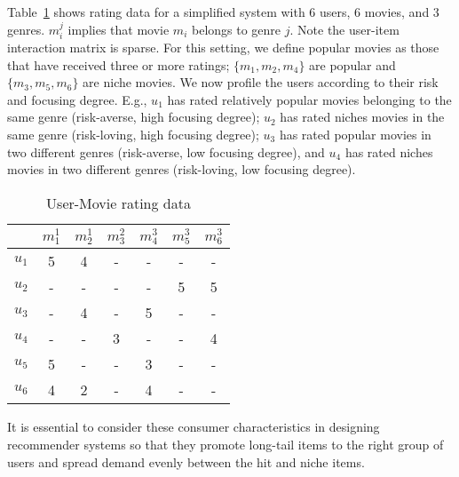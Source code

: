 \begin{example}  
Table~\ref{tab:example} shows rating data for a simplified system with $6$ users, $6$ movies, and $3$ genres. $m_i^{j}$ implies that movie $m_i$ belongs to genre $j$. Note the user-item interaction matrix is sparse. 
  For this setting, we define popular movies as those that have received  three or more ratings; $\{m_1, m_2, m_4\}$ are popular and  $\{m_3, m_5, m_6\}$ are niche movies. We now profile the users according to their risk and focusing degree. E.g., $u_1$ has rated relatively popular movies belonging to the same genre (risk-averse, high focusing degree); $u_2$ has rated niches movies in the same genre (risk-loving, high focusing degree); $u_3$ has rated popular movies in two different genres (risk-averse, low focusing degree), and $u_4$ has rated niches movies in two different genres (risk-loving, low focusing degree). 
\label{ex:running}
\end{example}
\begin{table}[htb]
\centering
\tiny
\begin{tabular}{ccccccc} 
\toprule
			&$m_1^{1}$ &$m_2^{1}$   &$m_3^{2}$    &$m_4^{3}$   &$m_5^{3}$ &$m_6^{3}$  \\ \hline 
$u_1 $ &5  &4  &-  &-  &-  &-   \\
$u_2$  &-  &-  &-  &-  &5  &5   \\
$u_3$  &-  &4  &-  &5  &-  &-   \\
$u_4$  &-  &-  &3  &-  &-  &4   \\ 
$u_5$  &5  &-  &-  &3  &-  &-   \\ 
$u_6$  &4  &2  &-  &4  &-  &-   \\ 
\bottomrule
\end{tabular}
\caption{User-Movie rating data} \label{tab:example}
\end{table}
It is essential to consider these consumer characteristics in designing recommender systems so that they promote long-tail items to the right group of users and spread demand evenly between the hit and niche items.  
\fi
\iffalse
